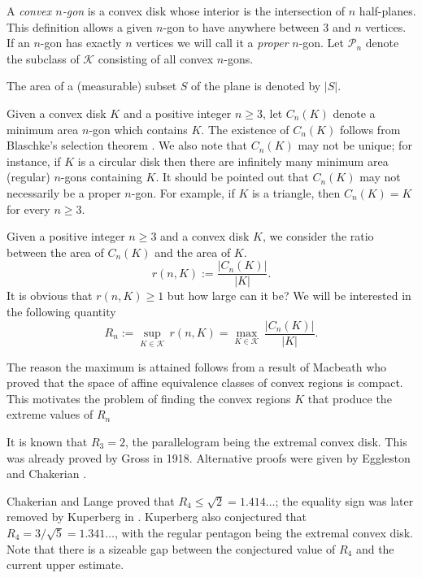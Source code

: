 \documentclass [10pt,oneside]{amsart}
\theoremstyle{definition}
\theoremstyle{plain}
\begin{document}
A \emph{convex $n$-gon} is a convex disk whose interior is the intersection of $n$ half-planes. This definition allows a given $n$-gon to have anywhere between 3 and $n$ vertices. If an $n$-gon has exactly $n$ vertices we will call it a \emph{proper} $n$-gon.
Let $\mathcal{P}_n$ denote the subclass of $\mathcal{K}$ consisting of all convex $n$-gons.

The area of a (measurable) subset $S$ of the plane is denoted by $|S|$.

Given a convex disk $K$ and a positive integer $n \ge 3$, let $C_n(K)$ denote a minimum area $n$-gon which contains $K$.
The existence of $C_n(K)$ follows from Blaschke's selection theorem \cite{blaschke}. We also note that $C_n(K)$ may not be unique; for instance,  if $K$ is a circular disk then there are infinitely many minimum area (regular) $n$-gons containing $K$.
It should be pointed out that $C_n(K)$ may not necessarily be a proper $n$-gon. For example, if $K$ is a triangle, then $C_n(K) = K$ for every $n \ge 3$.

Given  a positive integer $n\ge 3$ and a convex disk $K$, we consider the ratio between the area of $C_n(K)$ and the area of $K$.
\begin{equation*}
r(n, K):= \frac{|C_n(K)|}{|K|}.
\end{equation*}
It is obvious that $r(n,K)\ge 1$ but how large can it be? We will be interested in the following quantity
\begin{equation}\label{R_n}
R_n:=\sup_{K\in \mathcal{K}} \,r(n,K)=\max_{K\in \mathcal{K}}\, \frac{|C_n(K)|}{|K|}.
\end{equation}

The reason the maximum is attained follows from a result of Macbeath \cite{macbeath} who proved that the space of
affine equivalence classes of convex regions is compact.
This motivates the problem of finding the convex regions $K$ that produce the extreme values of $R_n$

It is known that $R_3=2$, the parallelogram being the extremal convex disk. This was already proved by Gross \cite{Gro18} in 1918. Alternative proofs were given by Eggleston \cite{Egg53} and  Chakerian \cite{Cha73}.

Chakerian and Lange \cite{CL71} proved that $R_4\le \sqrt{2}=1.414\ldots$; the equality sign was later removed by Kuperberg in \cite{Kup83}. Kuperberg also conjectured that $R_4=3/\sqrt{5}=1.341\ldots$, with the regular pentagon being the extremal convex disk. Note that there is a sizeable gap between the conjectured value of $R_4$ and the current upper estimate.
\end{document}
